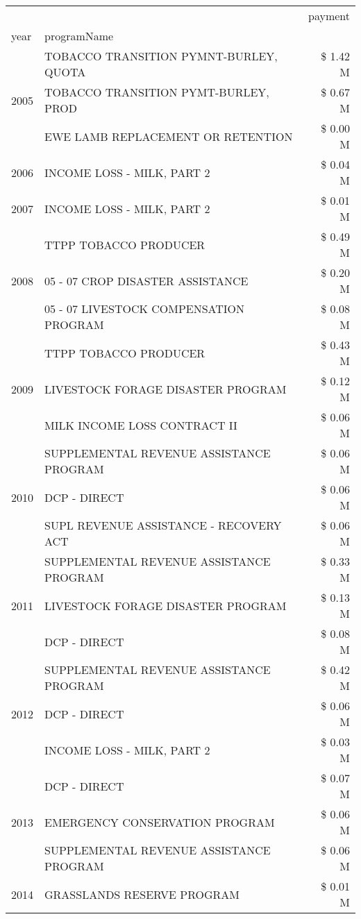 \begin{tabular}{llr}
\toprule
 &  & payment \\
year & programName &  \\
\midrule
\multirow[t]{3}{*}{2005} & TOBACCO TRANSITION PYMNT-BURLEY, QUOTA & \$ 1.42 M \\
 & TOBACCO TRANSITION PYMT-BURLEY, PROD & \$ 0.67 M \\
 & EWE LAMB REPLACEMENT OR RETENTION & \$ 0.00 M \\
\cline{1-3}
2006 & INCOME LOSS - MILK, PART 2 & \$ 0.04 M \\
\cline{1-3}
2007 & INCOME LOSS - MILK, PART 2 & \$ 0.01 M \\
\cline{1-3}
\multirow[t]{3}{*}{2008} & TTPP TOBACCO PRODUCER & \$ 0.49 M \\
 & 05 - 07 CROP DISASTER ASSISTANCE & \$ 0.20 M \\
 & 05 - 07 LIVESTOCK COMPENSATION PROGRAM & \$ 0.08 M \\
\cline{1-3}
\multirow[t]{3}{*}{2009} & TTPP TOBACCO PRODUCER & \$ 0.43 M \\
 & LIVESTOCK FORAGE DISASTER  PROGRAM & \$ 0.12 M \\
 & MILK INCOME LOSS CONTRACT II & \$ 0.06 M \\
\cline{1-3}
\multirow[t]{3}{*}{2010} & SUPPLEMENTAL REVENUE ASSISTANCE PROGRAM & \$ 0.06 M \\
 & DCP - DIRECT & \$ 0.06 M \\
 & SUPL REVENUE ASSISTANCE - RECOVERY ACT & \$ 0.06 M \\
\cline{1-3}
\multirow[t]{3}{*}{2011} & SUPPLEMENTAL REVENUE ASSISTANCE PROGRAM & \$ 0.33 M \\
 & LIVESTOCK FORAGE DISASTER PROGRAM & \$ 0.13 M \\
 & DCP - DIRECT & \$ 0.08 M \\
\cline{1-3}
\multirow[t]{3}{*}{2012} & SUPPLEMENTAL REVENUE ASSISTANCE PROGRAM & \$ 0.42 M \\
 & DCP - DIRECT & \$ 0.06 M \\
 & INCOME LOSS - MILK, PART 2 & \$ 0.03 M \\
\cline{1-3}
\multirow[t]{3}{*}{2013} & DCP - DIRECT & \$ 0.07 M \\
 & EMERGENCY CONSERVATION PROGRAM & \$ 0.06 M \\
 & SUPPLEMENTAL REVENUE ASSISTANCE PROGRAM & \$ 0.06 M \\
\cline{1-3}
\multirow[t]{3}{*}{2014} & GRASSLANDS RESERVE PROGRAM & \$ 0.01 M \\

\end{tabular}

